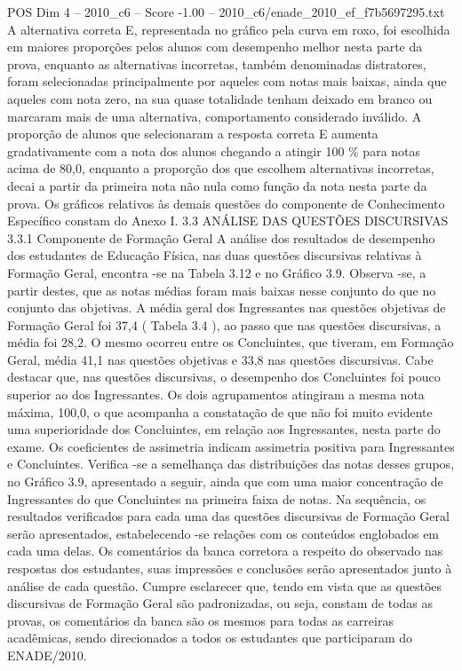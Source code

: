\begin{textsample}{POS Dim 4 – 2010\_c6 – Score -1.00 – 2010\_c6/enade\_2010\_ef\_f7b5697295.txt}
A alternativa correta E, representada no gráfico pela curva em roxo, foi escolhida em maiores proporções pelos alunos com desempenho melhor nesta parte da prova, enquanto as alternativas incorretas, também denominadas distratores, foram selecionadas principalmente por aqueles com notas mais baixas, ainda que aqueles com nota zero, na sua quase totalidade tenham deixado em branco ou marcaram mais de uma alternativa, comportamento considerado inválido.
A proporção de alunos que selecionaram a resposta correta E aumenta gradativamente com a nota dos alunos chegando a atingir 100 \% para notas acima de 80,0, enquanto a proporção dos que escolhem alternativas incorretas, decai a partir da primeira nota não nula como função da nota nesta parte da prova.
Os gráficos relativos às demais questões do componente de Conhecimento Específico constam do Anexo I. 3.3 ANÁLISE DAS QUESTÕES DISCURSIVAS 3.3.1 Componente de Formação Geral A análise dos resultados de desempenho dos estudantes de Educação Física, nas duas questões discursivas relativas à Formação Geral, encontra -se na Tabela 3.12 e no Gráfico 3.9.
Observa -se, a partir destes, que as notas médias foram mais baixas nesse conjunto do que no conjunto das objetivas.
A média geral dos Ingressantes nas questões objetivas de Formação Geral foi 37,4 ( Tabela 3.4 ), ao passo que nas questões discursivas, a média foi 28,2.
O mesmo ocorreu entre os Concluintes, que tiveram, em Formação Geral, média 41,1 nas questões objetivas e 33,8 nas questões discursivas.
Cabe destacar que, nas questões discursivas, o desempenho dos Concluintes foi pouco superior ao dos Ingressantes.
Os dois agrupamentos atingiram a mesma nota máxima, 100,0, o que acompanha a constatação de que não foi muito evidente uma superioridade dos Concluintes, em relação aos Ingressantes, nesta parte do exame.
Os coeficientes de assimetria indicam assimetria positiva para Ingressantes e Concluintes.
Verifica -se a semelhança das distribuições das notas desses grupos, no Gráfico 3.9, apresentado a seguir, ainda que com uma maior concentração de Ingressantes do que Concluintes na primeira faixa de notas.
Na sequência, os resultados verificados para cada uma das questões discursivas de Formação Geral serão apresentados, estabelecendo -se relações com os conteúdos englobados em cada uma delas.
Os comentários da banca corretora a respeito do observado nas respostas dos estudantes, suas impressões e conclusões serão apresentados junto à análise de cada questão.
Cumpre esclarecer que, tendo em vista que as questões discursivas de Formação Geral são padronizadas, ou seja, constam de todas as provas, os comentários da banca são os mesmos para todas as carreiras acadêmicas, sendo direcionados a todos os estudantes que participaram do ENADE/2010.

\end{textsample}
